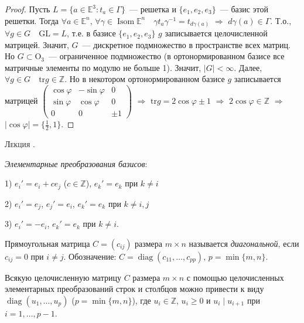 \documentclass[a4paper]{article}
\newcounter{lec}
\renewcommand{\thelec}{\Roman{lec}}
\newcommand*{\lecture}[1]{\refstepcounter{lec}\vspace{20pt}
\begin{center}{\rmfamily\textsc{Лекция \thelec. \\ \textbf{#1}}}\vspace{5pt}
\end{center}}
\renewcommand{\Isom}{\mathop{\mathrm{Isom}}\nolimits}
\renewcommand{\diag}{\mathop{\mathrm{diag}}\nolimits}
\begin{document}
\begin{proof}
Пусть $L=\{a\in\mathbb{E}^3:t_a\in\Gamma\}$~--- решетка и
$\{e_1,e_2,e_3\}$~--- базис этой решетки. Тогда $\forall
a\in\mathbb{E}^n$, $\forall \gamma\in\Isom\mathbb{E}^n\quad \gamma
t_a\gamma^{-1}=t_{d\gamma(a)}$ $\Rightarrow$ $d\gamma(a)\in\Gamma$.
Т.о., $\forall g\in G\quad \mathrm{GL}=L$, т.е. в базисе
$\{e_1,e_2,e_3\}$ $g$ записывается целочисленной матрицей. Значит,
$G$~--- дискретное подмножество в пространстве всех матриц. Но
$G\subset\mathrm{O}_3$~--- ограниченное подмножество (в
ортонормированном базисе все матричные элементы по модулю не больше
1). Значит, $|G|<\infty$. Далее, $\forall g\in G\quad
\mathrm{tr}g\in\mathbb{Z}$. Но в некотором ортонормированном базисе
$g$ записывается матрицей $\left(\begin{smallmatrix}\cos\varphi&
-\sin\varphi& 0\\ \sin\varphi& \cos\varphi& 0\\
0& 0& \pm1\end{smallmatrix}\right)$ $\Rightarrow$
$\mathrm{tr}g=2\cos\varphi\pm 1$ $\Rightarrow$
$2\cos\varphi\in\mathbb{Z}$ $\Rightarrow$ $|\cos\varphi|=\{\frac 12,
1\}$.
\end{proof}
\lecture{}

\emph{Элементарные преобразования базисов}:

1) $e_i'=e_i+ce_j$ ($c\in\mathbb{Z}$), $e_k'=e_k$ при $k\neq i$

2) $e_i'=e_j$, $e_j'=e_i$, $e_k'=e_k$ при $k\neq i,j$

3) $e_i'=-e_i$, $e_k'=e_k$ при $k\neq i$.

Прямоугольная матрица $C=(c_{ij})$ размера $m\times n$ называется
\emph{диагональной}, если $c_{ij}=0$ при $i\neq j$. Обозначение:
$C=\diag(c_{11},\ldots,c_{pp})$, $p=\min\{m,n\}$.

\begin{lemma}
\label{1.V}Всякую целочисленную матрицу $C$ размера $m\times n$ с
помощью целочисленных элементарных преобразований строк и столбцов
можно привести к виду $\diag(u_1,\ldots,u_p)$ ($p=\min\{m,n\}$), где
$u_i\in\mathbb{Z}$, $u_i\geqslant 0$ и $u_i\mid u_{i+1}$ при
$i=1,\ldots,p-1$.
\end{lemma}
\end{document}
